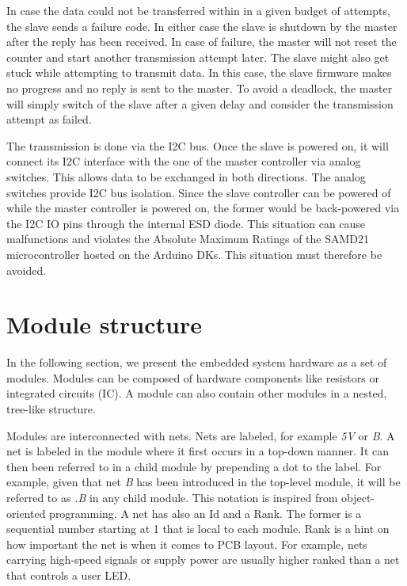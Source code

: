 In case the data could not be transferred within in a given budget of attempts, the slave sends a failure code.
In either case the slave is shutdown by the master after the reply has been received.
In case of failure, the master will not reset the counter and start
another transmission attempt later.
The slave might also get stuck while attempting to transmit data. In this case, the slave firmware makes no progress and no
reply is sent to the master. To avoid a deadlock, the master will simply switch of the slave after a given delay and consider
the transmission attempt as failed.
\par
The transmission is done via the I2C bus.
Once the slave is powered on, it will connect its I2C interface with the one of the master controller via analog switches.
This allows data to be exchanged in both directions.
The analog switches provide I2C bus isolation. Since the slave controller can be powered of while the master controller is
powered on, the former would  be back-powered via the I2C IO pins through the internal
ESD diode. This situation can cause malfunctions and violates the Absolute Maximum Ratings of the SAMD21 microcontroller
hosted on the Arduino DKs.
This situation must therefore be avoided.


\section{Module structure}


In the following section, we present the embedded system hardware as a set of modules.
Modules can be composed of hardware components like resistors or integrated circuits (IC).
A module can also contain other modules in a nested, tree-like structure.

Modules are interconnected with nets. Nets are labeled, for example \textit{5V} or \textit{B}.
A net is labeled  in the module where it first occurs in a top-down manner. It can then been referred to
in a child module by prepending a dot to the label. For example, given that net \textit{\emph{B}} has been introduced
in the top-level module, it will be referred to as \textit{\emph{.B}} in any child module.
This notation is inspired from object-oriented programming.
A net has also an Id and a Rank. The former is a sequential number starting at 1 that is local to each module.
Rank is a hint on how important the net is when it comes to PCB layout. For example, nets carrying high-speed signals
or supply power are usually higher ranked than a net that controls a user LED.
